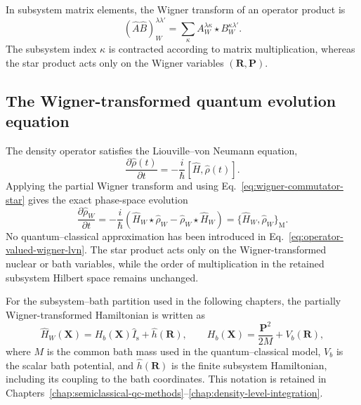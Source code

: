 \documentclass[
  11pt,
  letterpaper,
  onehalfspacing,
  normalmargins,
  equalmargins,
  oneside
]{ut-thesis}
\begin{document}
In subsystem matrix elements, the Wigner transform of an operator product is
\begin{equation}
(\hat A\hat B)_W^{\lambda\lambda'}
=
\sum_{\kappa}
A_W^{\lambda\kappa}
\star
B_W^{\kappa\lambda'}.
\label{eq:matrix-valued-star-product}
\end{equation}
The subsystem index \(\kappa\) is contracted according to matrix
multiplication, whereas the star product acts only on the Wigner variables
\((\mathbf R,\mathbf P)\).


\subsection{The Wigner-transformed quantum evolution equation}
\label{subsec:wigner-quantum-evolution}

The density operator satisfies the Liouville--von Neumann equation,
\begin{equation}
\frac{\partial\hat\rho(t)}{\partial t}
=
-\frac{i}{\hbar}
[\hat H,\hat\rho(t)].
\label{eq:lvn-recalled-for-wigner-transform}
\end{equation}
Applying the partial Wigner transform and using
Eq.~\eqref{eq:wigner-commutator-star} gives the exact phase-space evolution
\begin{equation}
\frac{\partial\hat\rho_W}{\partial t}
=
-\frac{i}{\hbar}
\left(
\hat H_W\star\hat\rho_W
-
\hat\rho_W\star\hat H_W
\right)
=
\{\hat H_W,\hat\rho_W\}_{\mathrm M}.
\label{eq:operator-valued-wigner-lvn}
\end{equation}
No quantum--classical approximation has been introduced in
Eq.~\eqref{eq:operator-valued-wigner-lvn}. The star product acts only on the
Wigner-transformed nuclear or bath variables, while the order of multiplication
in the retained subsystem Hilbert space remains unchanged.

For the subsystem--bath partition used in the following chapters, the
partially Wigner-transformed Hamiltonian is written as
\begin{equation}
\hat H_W(\mathbf X)
=
H_b(\mathbf X)\hat I_{\mathrm s}
+
\hat h(\mathbf R),
\qquad
H_b(\mathbf X)
=
\frac{\mathbf P^2}{2M}
+
V_b(\mathbf R),
\label{eq:wigner-subsystem-bath-hamiltonian}
\end{equation}
where \(M\) is the common bath mass used in the quantum--classical model,
\(V_b\) is the scalar bath potential, and \(\hat h(\mathbf R)\) is the finite
subsystem Hamiltonian, including its coupling to the bath coordinates. This
notation is retained in
\mbox{Chapters~\ref{chap:semiclassical-qc-methods}--\ref{chap:density-level-integration}}.
\end{document}

